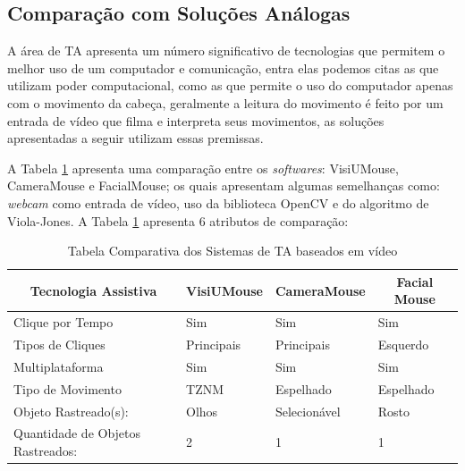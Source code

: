 \subsection{Comparação com Soluções Análogas}\label{Sub:tabela-comparativa}
A área de TA apresenta um número significativo de tecnologias que permitem o melhor uso de um computador e comunicação, entra elas podemos citas as que utilizam poder computacional, como as que permite o uso do computador apenas com o movimento da cabeça, geralmente a leitura do movimento é feito por um  entrada de vídeo que filma e interpreta seus movimentos, as soluções apresentadas a seguir utilizam essas premissas.

A Tabela \ref{tabela-comparativa} apresenta uma comparação entre os \textit{softwares}: VisiUMouse, CameraMouse e FacialMouse; os quais apresentam algumas semelhanças como: \textit{webcam} como entrada de vídeo, uso da biblioteca OpenCV e do algoritmo de Viola-Jones. A Tabela \ref{tabela-comparativa} apresenta 6 atributos de comparação:

\begin{table}[H]
\centering
\caption{Tabela Comparativa dos Sistemas de TA baseados em vídeo}
\label{tabela-comparativa}
\begin{tabular}{|l|l|l|l|}
\hline
\multicolumn{1}{|c|}{\textbf{Tecnologia Assistiva}} & \multicolumn{1}{c|}{\textbf{VisiUMouse}} & \multicolumn{1}{c|}{\textbf{CameraMouse}} & \multicolumn{1}{c|}{\textbf{Facial Mouse}} \\ \hline
Clique por Tempo                                     & \cellcolor[HTML]{67FD9A}Sim              & \cellcolor[HTML]{67FD9A}Sim                & \cellcolor[HTML]{67FD9A}Sim                \\ \hline
Tipos  de Cliques                                    & Principais                               & Principais                                 & Esquerdo                                   \\ \hline
Multiplataforma                                     & \cellcolor[HTML]{67FD9A}Sim              & \cellcolor[HTML]{67FD9A}Sim                & \cellcolor[HTML]{67FD9A}Sim                \\ \hline
Tipo de Movimento                                   & TZNM                                     & Espelhado                                  & Espelhado                                  \\ \hline
Objeto Rastreado(s):                                & Olhos                                    & Selecionável                              & Rosto                                      \\ \hline
Quantidade de Objetos Rastreados:                   & 2                                        & 1                                          & 1                                          \\ \hline
\end{tabular}
\end{table}

